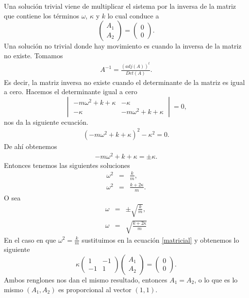 \documentclass[letterpaper,12pt,oneside]{book}
\begin{document}
%
Una soluci\'on trivial viene de multiplicar el sistema por la inversa de la matriz que contiene los t\'erminos $\omega$, $\kappa$ y $k$ lo cual conduce a 
%
\[\begin{pmatrix}
A_1\\
A_2\end{pmatrix}= \begin{pmatrix}
0\\
0\end{pmatrix}.\]
%
Una soluci\'on no trivial donde hay movimiento es cuando la inversa de la matriz no existe. Tomamos
%
\begin{eqnarray}
A^{-1} = \frac{(adj(A))^t}{Det(A)}.
\end{eqnarray}
%
Es decir, la matriz inversa no existe cuando el determinante de la matriz es igual a cero.
%
Hacemos el determinante igual a cero
%
\[\begin{vmatrix}
-m\omega ^2 + k + \kappa & -\kappa\\
-\kappa & -m\omega ^2 + k + \kappa
\end{vmatrix} = 0,\]
%
nos da la siguiente ecuaci\'on.
%
\begin{eqnarray}
(-m\omega ^2 + k + \kappa)^2 - \kappa ^2 = 0.
\end{eqnarray}
%
De ah\'i obtenemos
%
\begin{eqnarray}
-m \omega ^2 + k + \kappa =\pm \kappa .
\end{eqnarray}
%
Entonces tenemos las siguientes soluciones
%
\begin{eqnarray}
\omega ^2 &=& \frac{k}{m},\\
\omega ^2 &=& \frac{k+ 2 \kappa}{m}.
\end{eqnarray}
%
O sea
%
\begin{eqnarray}
\omega &=& \pm \sqrt{\frac{k}{m}},\\
\omega &=& \sqrt{\frac{k+ 2 \kappa}{m}}
\end{eqnarray}
%
En el caso en que $\omega ^2 =\frac{k}{m}$ sustituimos en la ecuaci\'on \ref{matricial} y obtenemos lo siguiente
%
\[\kappa \begin{pmatrix}
1 & -1\\
-1 & 1
\end{pmatrix} \begin{pmatrix}
A_1\\
A_2
\end{pmatrix} = \begin{pmatrix}
0\\
0
\end{pmatrix}.\]
%
Ambos renglones nos dan el mismo resultado, entonces $A_1 = A_2$, o lo que es lo mismo $(A_1, A_2)$ es proporcional al vector $(1,1)$.\\
\end{document}
